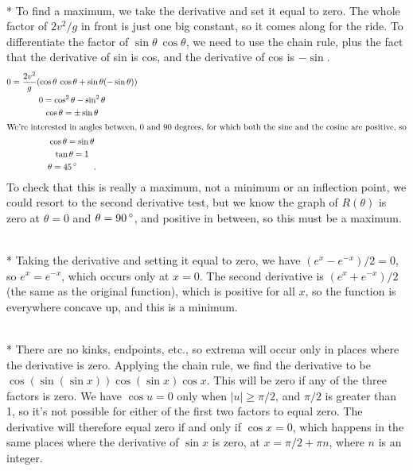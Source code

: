 \\*
To find a maximum, we take the derivative and set it equal to zero. The whole factor
of $2v^2/g$ in front is just one big constant, so it comes along for the ride. To differentiate
the factor of $\sin\theta\:\cos\theta$, we need to use the chain rule, plus the fact that
the derivative of sin is cos, and the derivative of cos is $-\sin$.
\begin{gather*}
  0 = \frac{2v^2}{g} (\cos\theta\:\cos\theta+\sin\theta(-\sin\theta)) \\
  0 = \cos^2\theta-\sin^2\theta \\
  \cos\theta = \pm \sin\theta \\
\intertext{We're interested in angles between, 0 and 90 degrees, for which both the sine and
the cosine are positive, so}
  \cos\theta = \sin\theta \\
  \tan\theta = 1\\
  \theta = 45\,^{\circ} \qquad .
\end{gather*}
To check that this is really a maximum, not a minimum or an inflection point, we could resort
to the second derivative test, but we know the graph of $R(\theta)$ is zero at $\theta=0$
and $\theta=90\,^{\circ}$, and positive in between, so this must be a maximum.

\\*
Taking the derivative and setting it equal to zero, we have $\left(e^x-e^{-x}\right)/2=0$, so $e^x=e^{-x}$, which
occurs only at $x=0$. The second derivative is $\left(e^x+e^{-x}\right)/2$ (the same as the original function),
which is positive for all $x$, so the function is everywhere concave up, and this is a minimum.

\\*
There are no kinks, endpoints, etc., so
extrema will occur only in places where the derivative is zero.
Applying the chain rule, we find the derivative to be $\cos(\sin(\sin x))\cos(\sin x)\cos x$.
This will be zero if any of the three factors is zero. We have $\cos u=0$ only when $|u| \ge \pi/2$,
and $\pi/2$ is greater than 1, so it's not possible for either of the first two factors to equal zero.
The derivative will therefore equal zero if and only if $\cos x=0$, which happens in the same places
where the derivative of $\sin x$ is zero, at $x=\pi/2+\pi n$, where $n$ is an integer.
%

